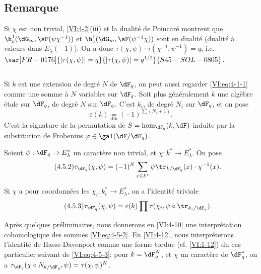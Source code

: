 \subsection{Remarque}\label{VI:4-4}

Si $\chi$ est non trivial, \ref{VI:4-2}(iii) et la dualité de Poincaré 
montrent que $\h_c^1(\dG_m,\sF(\psi\chi^{-1}))$ et 
$\h_c^1(\dG_m,\sF(\psi^{-1}\chi))$ sont en dualité (dualité à valeurs 
dans $E_\lambda(-1)$). On a donc 
$\tau(\chi,\psi)\cdot \tau(\chi^{-1},\psi^{-1}) = q$, i.e. 
$\var[FR-0176]{|\tau(\chi,\psi)|=q}{|\tau(\chi,\psi)|=q^{1/2}}{S45-SOL-0805}$. 





\subsection{}\label{VI:4-5}

Si $k$ est une extension de degré $N$ de $\dF_q$, on peut aussi regarder 
\eqref{VI:eq:4-1-1} comme une somme à $N$ variables sur $\dF_q$. Soit plus 
généralement $k$ une algèbre étale sur $\dF_q$, de degré $N$ sur 
$\dF_q$. C'est  $k_i$, de degré $N_i$ sur $\dF_q$, et on pose 
\begin{equation*}\tag{4.5.1}\label{VI:eq:4-5-1}
  \varepsilon(k) \underset{\mathrm{dfn}}{=} (-1)^{\sum (N_i+1)} \text{.} 
\end{equation*}
C'est la signature de la permutation de $S=\hom_{\dF_q}(k,\dF)$ induite par la 
substitution de Frobenius $\varphi\in \gal(\dF/\dF_q)$. 

Soient $\psi:\dF_q\to E_\lambda^\ast$ un caractère non trivial, et 
$\chi:k^\ast \to E_\lambda^\ast$. On pose 
\begin{equation*}\tag{4.5.2}\label{VI:eq:4-5-2}
  \tau_{\dF_q}(\chi,\psi) = (-1)^N \sum_{x\in k^\ast} \psi \tr_{k/\dF_q}(x) \cdot \chi^{-1}(x) \text{.} 
\end{equation*}

Si $\chi$ a pour coordonnées les $\chi_i:k_i^\ast \to E_\lambda^\ast$, on 
a l'identité triviale 
\begin{equation*}\tag{4.5.3}\label{VI:eq:4-5-3}
  \tau_{\dF_q}(\chi,\psi) = \varepsilon(k) \prod \tau(\chi_i,\psi\circ \tr_{k_i/\dF_q}) \text{.}
\end{equation*}

Après quelques préliminaires, nous donnerons en \ref{VI:4-10} une 
interprétation cohomologique des sommes \eqref{VI:eq:4-5-2}. En 
\ref{VI:4-12}, nous interpréterons l'identité de Hasse-Davenport comme une 
forme tordue (cf. \ref{VI:1-12}) du cas particulier suivant de 
\eqref{VI:eq:4-5-3}: pour $k=\dF_q^N$, et $\chi$ un caractère de 
$\dF_q^\ast$, on a 
$\tau_{\dF_q}(\chi\circ N_{k/\dF_q},\psi)=\tau(\chi,\psi)^N$. 





